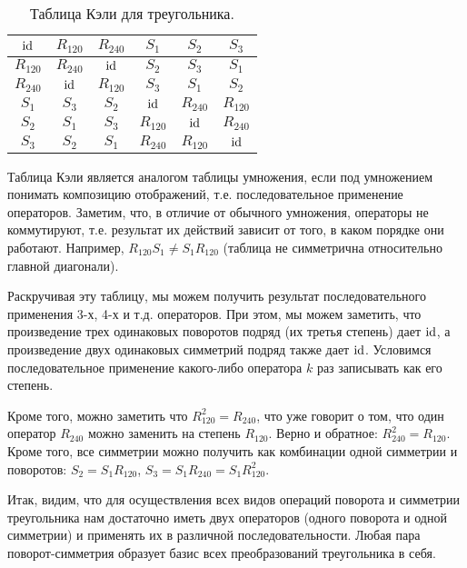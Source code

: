 \begin{table}[htb!]\begin{center}
\begin{tabular}{c|c|c|c|c|c|}
$\mathrm{id}$     & $R_{120}$ & $R_{240}$ & $S_1$ & $S_2$ & $S_3$ \\
\hline
$R_{120}$ & $R_{240}$ & $\mathrm{id}$     & $S_2$ & $S_3$ & $S_1$ \\
\hline
$R_{240}$ & $\mathrm{id}$     & $R_{120}$ & $S_3$ & $S_1$ & $S_2$ \\
\hline
$S_1$     & $S_3$     & $S_2$     & $\mathrm{id}$ & $R_{240}$ & $R_{120}$ \\
\hline
$S_2$     & $S_1$     & $S_3$     & $R_{120}$ & $\mathrm{id}$ & $R_{240}$ \\
\hline
$S_3$     & $S_2$     & $S_1$     & $R_{240}$ & $R_{120}$ & $\mathrm{id}$\\
\hline
\end{tabular}
\caption{Таблица Кэли для треугольника.}\label{triangle}
\end{center}\end{table}

Таблица Кэли является аналогом таблицы умножения, если под умножением понимать композицию отображений, т.е. последовательное применение операторов. Заметим, что, в отличие от обычного умножения, операторы не коммутируют, т.е. результат их действий зависит от того, в каком порядке они работают. Например, $R_{120}S_1\ne S_1R_{120}$ (таблица не симметрична относительно главной диагонали).

Раскручивая эту таблицу, мы можем получить результат последовательного применения 3-х, 4-х и т.д. операторов. При этом, мы можем заметить, что произведение трех одинаковых поворотов подряд (их третья степень) дает $\mathrm{id}$, а произведение двух одинаковых симметрий подряд также дает $\mathrm{id}$. Условимся последовательное применение какого-либо оператора $k$ раз записывать как его степень.

Кроме того, можно заметить что $R_{120}^2=R_{240}$, что уже говорит о том, что один оператор $R_{240}$ можно заменить на степень $R_{120}$. Верно и обратное: $R_{240}^2=R_{120}$. Кроме того, все симметрии можно получить как комбинации одной симметрии и поворотов: $S_2=S_1R_{120}$, $S_3=S_1R_{240}=S_1R_{120}^2$.

Итак, видим, что для осуществления всех видов операций поворота и симметрии треугольника нам достаточно иметь двух операторов (одного поворота и одной симметрии) и применять их в различной последовательности. Любая пара поворот-симметрия образует базис всех преобразований треугольника в себя.

